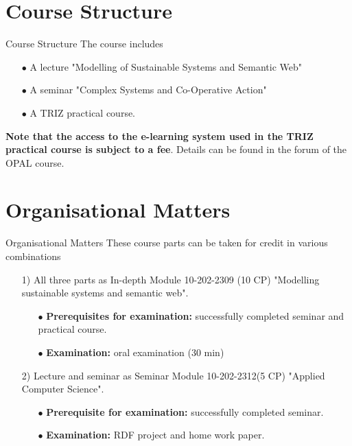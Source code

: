 \documentclass{beamer}
\begin{document}
\section{Course Structure}
\begin{frame}{Course Structure}
The course includes

\begin{itemize}
\item[$\bullet$] A lecture "Modelling of Sustainable Systems and Semantic Web"
\item[$\bullet$] A seminar "Complex Systems and Co-Operative Action"
\item[$\bullet$] A TRIZ practical course.
\end{itemize}
\textbf{Note that the access to the e-learning system used in the TRIZ
  practical course is subject to a fee}. Details can be found in the forum of
the OPAL course.
\end{frame}

\section{Organisational Matters}
\begin{frame}{Organisational Matters}
These course parts can be taken for credit in various combinations

\begin{itemize}
\item[1)] All three parts as In-depth Module 10-202-2309 (10 CP) "Modelling
  sustainable systems and semantic web".
  \begin{itemize}[noitemsep]
  \item[$\bullet$] \textbf{Prerequisites for examination:} successfully
    completed seminar and practical course.
  \item[$\bullet$] \textbf{Examination:} oral examination (30 min)
  \end{itemize}
\item[2)] Lecture and seminar as Seminar Module 10-202-2312(5 CP) "Applied
  Computer Science".
  \begin{itemize}[noitemsep]
  \item[$\bullet$] \textbf{Prerequisite for examination:} successfully
    completed seminar.
  \item[$\bullet$] \textbf{Examination:} RDF project and home work paper.
  \end{itemize}
\end{itemize}
\end{frame}
\end{document}
